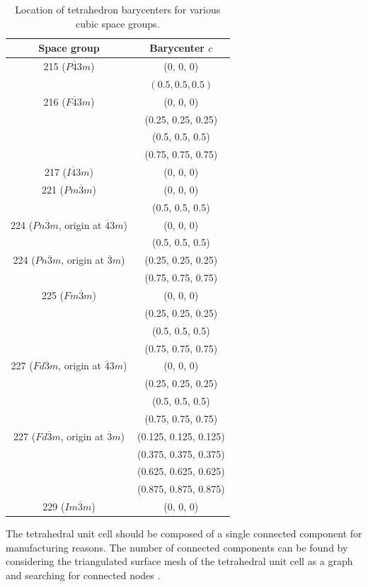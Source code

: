\documentclass{article}
\begin{document}
\begin{table}
\caption{Location of tetrahedron barycenters for various cubic space groups.}
\label{table:tet_locations}
\centering
\begin{tabular}{c c} 
 \hline\hline
 Space group & Barycenter $c$ \\ 
 \hline\hline
 215 ($P\overline{4}3m$) & (0, 0, 0) \\
 & $(0.5, 0.5, 0.5)$ \\
 \hline
 216 ($F\overline{4}3m$) & (0, 0, 0) \\
 & (0.25, 0.25, 0.25) \\
 & (0.5, 0.5, 0.5) \\
 & (0.75, 0.75, 0.75) \\
 \hline
 217 ($I\overline{4}3m$) & (0, 0, 0) \\
 \hline
 221 ($Pm\overline{3}m$) & (0, 0, 0) \\
 & (0.5, 0.5, 0.5) \\
 \hline
 224 ($Pn\overline{3}m$, origin at $\overline{4}3m$) & (0, 0, 0) \\
 & (0.5, 0.5, 0.5) \\
 \hline
 224 ($Pn\overline{3}m$, origin at $\overline{3}m$) & (0.25, 0.25, 0.25) \\
 & (0.75, 0.75, 0.75) \\
 \hline
 225 ($Fm\overline{3}m$) & (0, 0, 0) \\
 & (0.25, 0.25, 0.25) \\
 & (0.5, 0.5, 0.5) \\
 & (0.75, 0.75, 0.75) \\
 \hline
 227 ($Fd\overline{3}m$, origin at $\overline{4}3m$) & (0, 0, 0) \\
 & (0.25, 0.25, 0.25) \\
 & (0.5, 0.5, 0.5) \\
 & (0.75, 0.75, 0.75) \\
 \hline
 227 ($Fd\overline{3}m$, origin at $\overline{3}m$) &  (0.125, 0.125, 0.125) \\
 & (0.375, 0.375, 0.375) \\
 & (0.625, 0.625, 0.625) \\
 & (0.875, 0.875, 0.875) \\
 \hline
 229 ($Im\overline{3}m$) & (0, 0, 0) \\
 \hline
\end{tabular}
\end{table}

The tetrahedral unit cell should be composed of a single connected component for manufacturing reasons. The number of connected components can be found by considering the triangulated surface mesh of the tetrahedral unit cell as a graph and searching for connected nodes \cite{hopcroft1973algorithm}.
\end{document}
